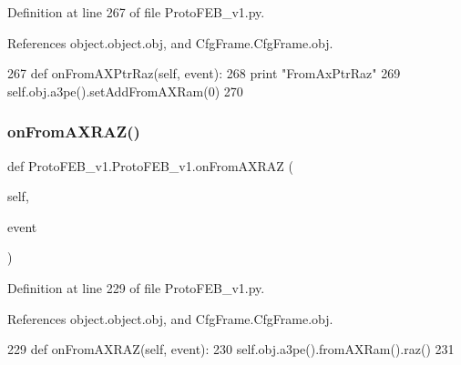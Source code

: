 Definition at line 267 of file Proto\+F\+E\+B\+\_\+v1.\+py.



References object.\+object.\+obj, and Cfg\+Frame.\+Cfg\+Frame.\+obj.


\begin{DoxyCode}
267     \textcolor{keyword}{def }onFromAXPtrRaz(self, event):
268         \textcolor{keywordflow}{print} \textcolor{stringliteral}{"FromAxPtrRaz"}
269         self.obj.a3pe().setAddFromAXRam(0)
270 
\end{DoxyCode}
\mbox{\label{classProtoFEB__v1_1_1ProtoFEB__v1_a4829ef01438ae9be1106a715ba8feffd}} 
\subsubsection{\texorpdfstring{on\+From\+A\+X\+R\+A\+Z()}{onFromAXRAZ()}}
{\footnotesize\ttfamily def Proto\+F\+E\+B\+\_\+v1.\+Proto\+F\+E\+B\+\_\+v1.\+on\+From\+A\+X\+R\+AZ (\begin{DoxyParamCaption}\item[{}]{self,  }\item[{}]{event }\end{DoxyParamCaption})}



Definition at line 229 of file Proto\+F\+E\+B\+\_\+v1.\+py.



References object.\+object.\+obj, and Cfg\+Frame.\+Cfg\+Frame.\+obj.


\begin{DoxyCode}
229     \textcolor{keyword}{def }onFromAXRAZ(self, event):
230         self.obj.a3pe().fromAXRam().raz()
231 
\end{DoxyCode}
\mbox{\label{classProtoFEB__v1_1_1ProtoFEB__v1_a9bb0cbe720de19edf05beadcd7de581d}} 

